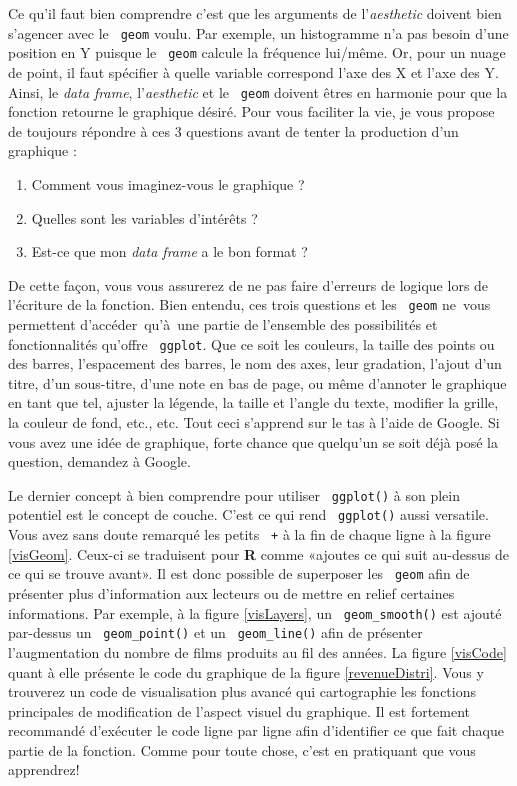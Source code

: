 \documentclass[10.5pt,a4paper]{article}
\newcommand{\rcode}[1]{\texttt{\color{rstudio} #1}}
\begin{document}
  Ce qu'il faut bien comprendre c'est que les arguments de l'\textit{aesthetic} doivent bien s'agencer avec le \rcode{geom} voulu. Par exemple, un histogramme n'a pas besoin d'une position en Y puisque le \rcode{geom} calcule la fréquence lui\-/même. Or, pour un nuage de point, il faut spécifier à quelle variable correspond l'axe des X et l'axe des Y. Ainsi, le \emph{data frame}, l'\textit{aesthetic} et le \rcode{geom} doivent êtres en harmonie pour que la fonction retourne le graphique désiré. Pour vous faciliter la vie, je vous propose de toujours répondre à ces 3 questions avant de tenter la production d'un graphique : 
  \begin{enumerate}
  \item Comment vous imaginez-vous le graphique ? 
  \item Quelles sont les variables d'intérêts ?
  \item Est-ce que mon \emph{data frame} a le bon format ?
  \end{enumerate}
  De cette façon, vous vous assurerez de ne pas faire d'erreurs de logique lors de l'écriture de la fonction. Bien entendu, ces trois questions et les \rcode{geom} ne\ vous permettent d'acc\'eder\ qu'\`a\ une partie de l'ensemble des possibilités et fonctionnalités qu'offre \rcode{ggplot}. Que ce soit les couleurs, la taille des points ou des barres, l'espacement des barres, le nom des axes, leur gradation, l'ajout d'un titre, d'un sous-titre, d'une note en bas de page, ou même d'annoter le graphique en tant que tel, ajuster la légende, la taille et l'angle du texte, modifier la grille, la couleur de fond, etc., etc. Tout ceci s'apprend sur le tas à l'aide de Google. Si vous avez une idée de graphique, forte chance que quelqu'un se soit déjà posé la question, demandez à Google.
  
  Le dernier concept à bien comprendre pour utiliser \rcode{ggplot()} à son plein potentiel est le concept de couche. C'est ce qui rend \rcode{ggplot()} aussi versatile. Vous avez sans doute remarqué les petits \rcode{+} à la fin de chaque ligne à la figure \ref{visGeom}. Ceux-ci se traduisent pour \textbf{R} comme «ajoutes ce qui suit au-dessus de ce qui se trouve avant». Il est donc possible de superposer les \rcode{geom} afin de présenter plus d'information aux lecteurs ou de mettre en relief certaines informations. Par exemple, à la figure \ref{visLayers}, un \rcode{geom\_smooth()} est ajouté par-dessus un \rcode{geom\_point()} et un \rcode{geom\_line()} afin de présenter l'augmentation du nombre de films produits au fil des années. La figure \ref{visCode} quant à elle présente le code du graphique de la figure \ref{revenueDistri}. Vous y trouverez un code de visualisation plus avancé qui cartographie les fonctions principales de modification de l'aspect visuel du graphique. Il est fortement recommandé d'exécuter le code ligne par ligne afin d'identifier ce que fait chaque partie de la fonction. Comme pour toute chose, c'est en pratiquant que vous apprendrez! 
  
\end{document}
